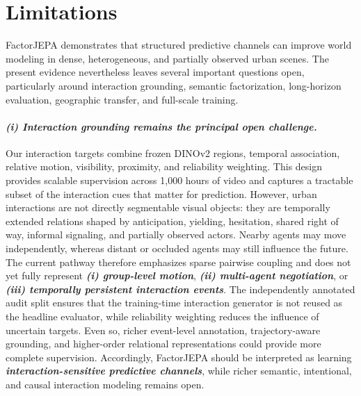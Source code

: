\section{\textbf{Limitations}}

FactorJEPA demonstrates that structured predictive channels can improve world modeling in dense, heterogeneous, and partially observed urban scenes. The present evidence nevertheless leaves several important questions open, particularly around interaction grounding, semantic factorization, long-horizon evaluation, geographic transfer, and full-scale training.

\paragraph{\textbf{\emph{(i) Interaction grounding remains the principal open challenge.}}} Our interaction targets combine frozen DINOv2 regions, temporal association, relative motion, visibility, proximity, and reliability weighting. This design provides scalable supervision across 1,000 hours of video and captures a tractable subset of the interaction cues that matter for prediction. However, urban interactions are not directly segmentable visual objects: they are temporally extended relations shaped by anticipation, yielding, hesitation, shared right of way, informal signaling, and partially observed actors. Nearby agents may move independently, whereas distant or occluded agents may still influence the future. The current pathway therefore emphasizes sparse pairwise coupling and does not yet fully represent \textbf{\emph{(i) group-level motion}}, \textbf{\emph{(ii) multi-agent negotiation}}, or \textbf{\emph{(iii) temporally persistent interaction events}}. The independently annotated audit split ensures that the training-time interaction generator is not reused as the headline evaluator, while reliability weighting reduces the influence of uncertain targets. Even so, richer event-level annotation, trajectory-aware grounding, and higher-order relational representations could provide more complete supervision. Accordingly, FactorJEPA should be interpreted as learning \textbf{\emph{interaction-sensitive predictive channels}}, while richer semantic, intentional, and causal interaction modeling remains open.

